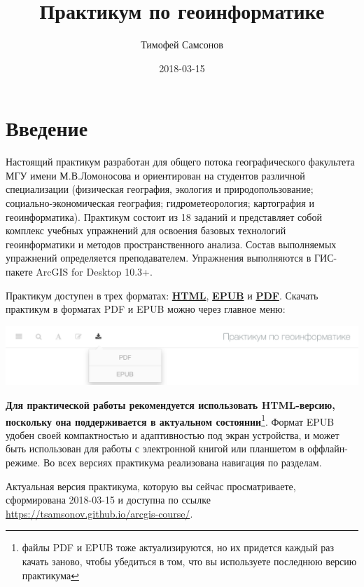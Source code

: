 \documentclass[]{book}
\title{Практикум по геоинформатике}
\author{Тимофей Самсонов}
\date{2018-03-15}
\let\rmarkdownfootnote\footnote%
\def\footnote{\protect\rmarkdownfootnote}
\theoremstyle{definition}
\theoremstyle{definition}
\theoremstyle{definition}
\theoremstyle{remark}
\begin{document}
\maketitle

{
\setcounter{tocdepth}{1}
\tableofcontents
}
\chapter*{Введение}

Настоящий практикум разработан для общего потока географического
факультета МГУ имени М.В.Ломоносова и ориентирован на студентов
различной специализации (физическая география, экология и
природопользование; социально-экономическая география;
гидрометеорология; картография и геоинформатика). Практикум состоит из
18 заданий и представляет собой комплекс учебных упражнений для освоения
базовых технологий геоинформатики и методов пространственного анализа.
Состав выполняемых упражнений определяется преподавателем. Упражнения
выполняются в ГИС-пакете ArcGIS for Desktop 10.3+.

Практикум доступен в трех форматах:
\href{https://tsamsonov.github.io/arcgis-course/}{\textbf{HTML}},
\href{https://tsamsonov.github.io/arcgis-course/arcgis-course.epub}{\textbf{EPUB}}
и
\href{https://tsamsonov.github.io/arcgis-course/arcgis-course.pdf}{\textbf{PDF}}.
Скачать практикум в форматах PDF и EPUB можно через главное меню:

\includegraphics{images/download.png}

\textbf{Для практической работы рекомендуется использовать HTML-версию,
поскольку она поддерживается в актуальном состоянии}\footnote{файлы PDF
  и EPUB тоже актуализируются, но их придется каждый раз качать заново,
  чтобы убедиться в том, что вы используете последнюю версию практикума}.
Формат EPUB удобен своей компактностью и адаптивностью под экран
устройства, и может быть использован для работы с электронной книгой или
планшетом в оффлайн-режиме. Во всех версиях практикума реализована
навигация по разделам.

Актуальная версия практикума, которую вы сейчас просматриваете,
сформирована 2018-03-15 и доступна по ссылке
\url{https://tsamsonov.github.io/arcgis-course/}.
\end{document}
